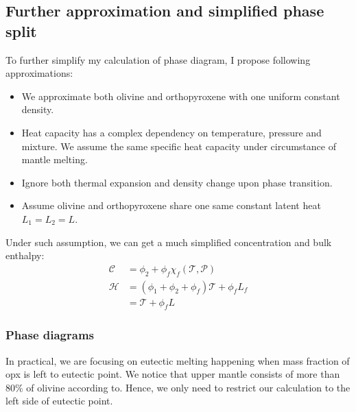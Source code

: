 \subsection{Further approximation and simplified phase split}
To further simplify my calculation of phase diagram, I propose following approximations:
\begin{itemize}
\item  We approximate both olivine and orthopyroxene with one uniform constant density.
\item  Heat capacity has a complex dependency on temperature, pressure and mixture. We assume the same 
		  specific heat capacity under circumstance of mantle melting.
\item  Ignore both thermal expansion and density change upon phase transition.
\item  Assume olivine and orthopyroxene share one same constant latent heat $L_1 = L_2 = L$.
\end{itemize}
Under such assumption, we can get a much simplified concentration and bulk enthalpy:
\begin{equation}
\begin{aligned}
\mathcal{C} &= \phi_2 + \phi_f \chi_f(\mathcal{T}, \mathcal{P}) \\
\mathcal{H} &= (\phi_1 + \phi_2 + \phi_f)\mathcal{T} + \phi_f L_f \\
            &= \mathcal{T}  + \phi_f L
\end{aligned}
\end{equation}

\subsubsection{Phase diagrams}
In practical, we are focusing on eutectic melting happening when mass fraction
of opx is left to eutectic point. We notice that upper mantle consists of more
than $80\%$ of olivine according to\cite{TheCompositionEarth}. Hence, we only need to
restrict our calculation to the left side of eutectic point.

